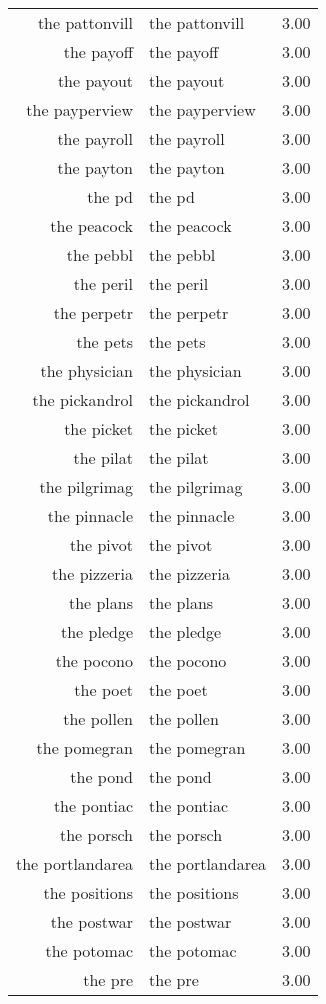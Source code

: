 \begin{table}[ht]
\begin{tabular}{rlr}
  the pattonvill & the pattonvill & 3.00 \\ 
  the payoff & the payoff & 3.00 \\ 
  the payout & the payout & 3.00 \\ 
  the payperview & the payperview & 3.00 \\ 
  the payroll & the payroll & 3.00 \\ 
  the payton & the payton & 3.00 \\ 
  the pd & the pd & 3.00 \\ 
  the peacock & the peacock & 3.00 \\ 
  the pebbl & the pebbl & 3.00 \\ 
  the peril & the peril & 3.00 \\ 
  the perpetr & the perpetr & 3.00 \\ 
  the pets & the pets & 3.00 \\ 
  the physician & the physician & 3.00 \\ 
  the pickandrol & the pickandrol & 3.00 \\ 
  the picket & the picket & 3.00 \\ 
  the pilat & the pilat & 3.00 \\ 
  the pilgrimag & the pilgrimag & 3.00 \\ 
  the pinnacle & the pinnacle & 3.00 \\ 
  the pivot & the pivot & 3.00 \\ 
  the pizzeria & the pizzeria & 3.00 \\ 
  the plans & the plans & 3.00 \\ 
  the pledge & the pledge & 3.00 \\ 
  the pocono & the pocono & 3.00 \\ 
  the poet & the poet & 3.00 \\ 
  the pollen & the pollen & 3.00 \\ 
  the pomegran & the pomegran & 3.00 \\ 
  the pond & the pond & 3.00 \\ 
  the pontiac & the pontiac & 3.00 \\ 
  the porsch & the porsch & 3.00 \\ 
  the portlandarea & the portlandarea & 3.00 \\ 
  the positions & the positions & 3.00 \\ 
  the postwar & the postwar & 3.00 \\ 
  the potomac & the potomac & 3.00 \\ 
  the pre & the pre & 3.00 \\ 

\end{tabular}
\end{table}
